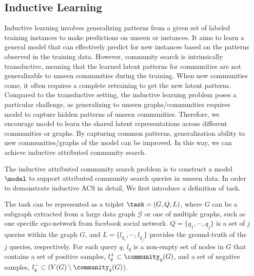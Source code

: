 \subsection{Inductive Learning}
Inductive learning involves generalizing patterns from a given set of labeled training instances to make predictions on unseen or instances. It aims to learn a general model that can effectively predict for new instances based on the patterns observed in the training data.
However, community search is intrinsically transductive, meaning that the learned latent patterns for communities are not generalizable to unseen communities during the training. When new communities come, it often requires a complete retraining to get the new latent patterns.
Compared to the transductive setting, the inductive learning problem poses a particular challenge, as generalizing to unseen graphs/communities requires model to capture hidden patterns of unseen communities.
Therefore, we encourage model to learn the shared latent representations across different communities or graphs. By capturing common patterns, generalization ability to new communities/graphs of the model can be improved. In this way, we can achieve inductive attributed community search.

The inductive attributed community search problem is to construct a model $\model$ to support attributed community search queries in unseen data. In order to demonstrate inductive ACS in detail, We first introduce a definition of task.

 The task can be represented as a triplet $\task = (G, Q, L)$, where $G$ can be a subgraph extracted from a large data graph ${\mathcal G}$ or one of multiple graphs, such as one specific ego-network from facebook social network. $Q= \{ q_1, \cdots, q_{j} \}$ is a set of $j$ queries within the graph $G$, and $L = \{ l_{q_1}, \cdots, l_{q_j}\}$ provides the ground-truth of the $j$ queries, respectively. For each query $q$, $l_{q}$ is a non-empty set of nodes in $G$ that contains a set of positive samples, $l_q^+ \subset \community_{q}(G)$, and a set of negative samples, $l_q^{-} \subset (V(G) \setminus \community_{q}(G)$).

